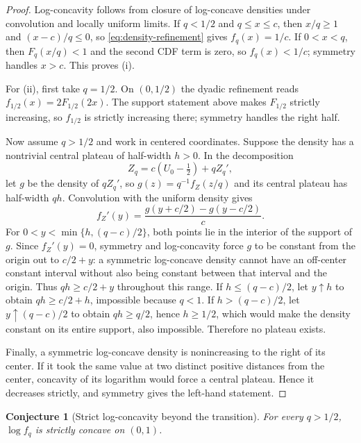 \documentclass[11pt,oneside]{article}
\newtheorem{conjecture}[theorem]{Conjecture}
\theoremstyle{definition}
\theoremstyle{remark}
\begin{document}
\begin{proof}
Log-concavity follows from closure of log-concave densities under convolution and locally
uniform limits.  If $q<1/2$ and $q\le x\le c$, then $x/q\ge1$ and $(x-c)/q\le0$, so
\eqref{eq:density-refinement} gives $f_q(x)=1/c$.  If $0<x<q$, then
$F_q(x/q)<1$ and the second CDF term is zero, so $f_q(x)<1/c$; symmetry handles $x>c$.
This proves (i).

For (ii), first take $q=1/2$.  On $(0,1/2)$ the dyadic refinement reads
$f_{1/2}(x)=2F_{1/2}(2x)$.  The support statement above makes $F_{1/2}$ strictly increasing,
so $f_{1/2}$ is strictly increasing there; symmetry handles the right half.

Now assume $q>1/2$ and work in centered coordinates.  Suppose the density has a nontrivial
central plateau of half-width $h>0$.  In the decomposition
\[
 Z_q=c(U_0-\tfrac12)+qZ_q',
\]
let $g$ be the density of $qZ_q'$, so $g(z)=q^{-1}f_Z(z/q)$ and its central plateau has
half-width $qh$.  Convolution with the uniform density gives
\begin{equation}
 f_Z'(y)=\frac{g(y+c/2)-g(y-c/2)}{c}.                         \label{eq:plateau-derivative}
\end{equation}
For $0<y<\min\{h,(q-c)/2\}$, both points lie in the interior of the support of $g$.
Since $f_Z'(y)=0$, symmetry and log-concavity force $g$ to be constant from the origin out to
$c/2+y$: a symmetric log-concave density cannot have an off-center constant interval without
also being constant between that interval and the origin.  Thus $qh\ge c/2+y$ throughout
this range.  If $h\le(q-c)/2$, let $y\uparrow h$ to obtain $qh\ge c/2+h$, impossible because
$q<1$.  If $h>(q-c)/2$, let $y\uparrow(q-c)/2$ to obtain $qh\ge q/2$, hence $h\ge1/2$, which
would make the density constant on its entire support, also impossible.  Therefore no
plateau exists.

Finally, a symmetric log-concave density is nonincreasing to the right of its center.  If it
took the same value at two distinct positive distances from the center, concavity of its
logarithm would force a central plateau.  Hence it decreases strictly, and symmetry gives the
left-hand statement.
\end{proof}

\begin{conjecture}[Strict log-concavity beyond the transition]
\label{conj:strict-logconcavity}
For every $q>1/2$, $\log f_q$ is strictly concave on $(0,1)$.
\end{conjecture}
\end{document}
